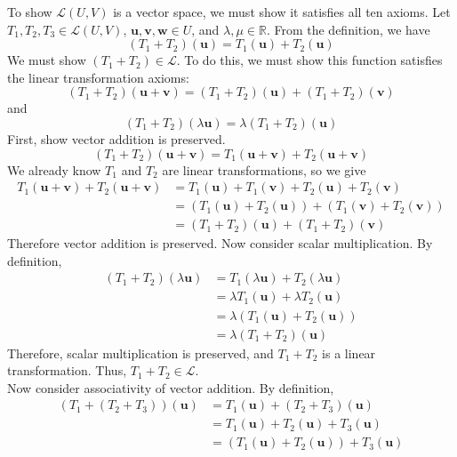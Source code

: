 \documentclass[12pt, letterpaper]{article}
\begin{document}
\begin{solution}
    To show \(\mathcal{L} (U,V)\) is a vector space, we must show it satisfies all ten axioms. Let \(T_1,T_2,T_3\in \mathcal{L} (U,V)\), \(\mathbf{u},\mathbf{v},\mathbf{w}\in U\), and \(\lambda ,\mu \in \mathbb{R}\). From the definition, we have
    \[
        (T_1 +T_2)(\mathbf{u})=T_1 (\mathbf{u})+T_2(\mathbf{u})
    \]
    We must show \((T_1 +T_2)\in \mathcal{L} \). To do this, we must show this function satisfies the linear transformation axioms:
    \[
        (T_1 +T_2)(\mathbf{u}+\mathbf{v})=(T_1 +T_2)(\mathbf{u})+(T_1 +T_2)(\mathbf{v})
    \]
    and
    \[
        (T_1 +T_2)(\lambda \mathbf{u})=\lambda (T_1 +T_2)(\mathbf{u})
    \]
    First, show vector addition is preserved.
    \[
        (T_1 +T_2)(\mathbf{u}+\mathbf{v})=T_1 (\mathbf{u}+\mathbf{v})+T_2(\mathbf{u}+\mathbf{v})
    \]
    We already know \(T_1\) and \(T_2\) are linear transformations, so we give 
    \begin{align*}
        T_1 (\mathbf{u}+\mathbf{v})+T_2(\mathbf{u}+\mathbf{v}) &= T_1(\mathbf{u})+T_1 (\mathbf{v})+T_2(\mathbf{u})+T_2(\mathbf{v})\\
        &=(T_1 (\mathbf{u})+T_2(\mathbf{u}))+(T_1(\mathbf{v})+T_2(\mathbf{v}))\\
        &=(T_{1}+T_2 )(\mathbf{u})+(T_1 +T_2)(\mathbf{v})
    \end{align*}
    Therefore vector addition is preserved. Now consider scalar multiplication. By definition,
    \begin{align*}
        (T_1 +T_2)(\lambda \mathbf{u})&=T_1 (\lambda \mathbf{u})+T_2 (\lambda \mathbf{u})\\
        &= \lambda T_1 (\mathbf{u})+\lambda T_2(\mathbf{u})\\
        &=\lambda (T_1 (\mathbf{u})+T_2(\mathbf{u}))\\
        &=\lambda (T_1 +T_2)(\mathbf{u})
    \end{align*}
    Therefore, scalar multiplication is preserved, and \(T_1 +T_2\) is a linear transformation. Thus, \(T_1 +T_2\in\mathcal{L} \).\\
    Now consider associativity of vector addition. By definition,
    \begin{align*}
        (T_1 +(T_2 +T_3))(\mathbf{u})&=T_1 (\mathbf{u})+(T_2 +T_3)(\mathbf{u})\\
        &=T_1 (\mathbf{u})+T_2(\mathbf{u})+T_3(\mathbf{u})\\
        &=(T_1(\mathbf{u})+T_2(\mathbf{u}))+T_3(\mathbf{u})\\

\end{align*}
\end{solution}
\end{document}
